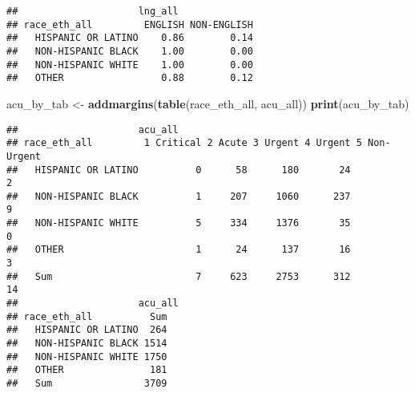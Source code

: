 \documentclass[]{article}
\newenvironment{Shaded}{\begin{snugshade}}{\end{snugshade}}
\newcommand{\KeywordTok}[1]{\textcolor[rgb]{0.13,0.29,0.53}{\textbf{#1}}}
\newcommand{\DataTypeTok}[1]{\textcolor[rgb]{0.13,0.29,0.53}{#1}}
\newcommand{\DecValTok}[1]{\textcolor[rgb]{0.00,0.00,0.81}{#1}}
\newcommand{\StringTok}[1]{\textcolor[rgb]{0.31,0.60,0.02}{#1}}
\newcommand{\OperatorTok}[1]{\textcolor[rgb]{0.81,0.36,0.00}{\textbf{#1}}}
\newcommand{\NormalTok}[1]{#1}
\begin{document}
\begin{Shaded}
\end{Shaded}

\begin{verbatim}
##                     lng_all
## race_eth_all         ENGLISH NON-ENGLISH
##   HISPANIC OR LATINO    0.86        0.14
##   NON-HISPANIC BLACK    1.00        0.00
##   NON-HISPANIC WHITE    1.00        0.00
##   OTHER                 0.88        0.12
\end{verbatim}

\begin{Shaded}
\begin{Highlighting}[]
\NormalTok{acu_by_tab <-}\StringTok{ }\KeywordTok{addmargins}\NormalTok{(}\KeywordTok{table}\NormalTok{(race_eth_all, acu_all))}
\KeywordTok{print}\NormalTok{(acu_by_tab)}
\end{Highlighting}
\end{Shaded}

\begin{verbatim}
##                     acu_all
## race_eth_all         1 Critical 2 Acute 3 Urgent 4 Urgent 5 Non-Urgent
##   HISPANIC OR LATINO          0      58      180       24            2
##   NON-HISPANIC BLACK          1     207     1060      237            9
##   NON-HISPANIC WHITE          5     334     1376       35            0
##   OTHER                       1      24      137       16            3
##   Sum                         7     623     2753      312           14
##                     acu_all
## race_eth_all          Sum
##   HISPANIC OR LATINO  264
##   NON-HISPANIC BLACK 1514
##   NON-HISPANIC WHITE 1750
##   OTHER               181
##   Sum                3709
\end{verbatim}

\begin{Shaded}
\end{Shaded}
\end{document}
